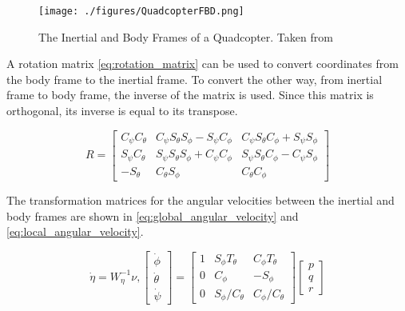 \documentclass[letterpaper,12pt,titlepage,oneside,final]{book}
\begin{document}
\begin{figure}
\centering
\texttt{[image: ./figures/QuadcopterFBD.png]}
\caption{The Inertial and Body Frames of a Quadcopter. Taken from \cite{luukkonen} } %
\label{fig:FBD}
\end{figure}

A rotation matrix \eqref{eq:rotation_matrix} can be used to convert coordinates from the body frame to the inertial frame. 
To convert the other way, from inertial frame to body frame, the inverse of the matrix is used. 
Since this matrix is orthogonal, its inverse is equal to its transpose.

\begin{equation} \label{eq:rotation_matrix}
R = 
\begin{bmatrix}
C_{\psi}C_{\theta} & C_{\psi}S_{\theta}S_{\phi} - S_{\psi}C_{\phi} & C_{\psi}S_{\theta}C_{\phi} + S_{\psi}S_{\phi} \\
S_{\psi}C_{\theta} & S_{\psi}S_{\theta}S_{\phi} + C_{\psi}C_{\phi} & S_{\psi}S_{\theta}C_{\phi} - C_{\psi}S_{\phi} \\
-S_{\theta} & C_{\theta}S_{\phi} & C_{\theta}C_{\phi}
\end{bmatrix}
\end{equation}

The transformation matrices for the angular velocities between the inertial and body frames are shown in \eqref{eq:global_angular_velocity} and \eqref{eq:local_angular_velocity}.

\begin{equation} \label{eq:global_angular_velocity}
\dot{\eta} = W_{\eta}^{-1}\nu, 
\begin{bmatrix}
\dot{\phi} \\
\dot{\theta} \\
\dot{\psi}
\end{bmatrix}
=
\begin{bmatrix}
1 & S_{\phi}T_{\theta} & C_{\phi}T_{\theta} \\
0 & C_{\phi} & -S_{\phi} \\
0 & S_{\phi}/C_{\theta} & C_{\phi}/C_{\theta}
\end{bmatrix}
\begin{bmatrix}
p \\
q \\
r
\end{bmatrix}
\end{equation}
\end{document}
